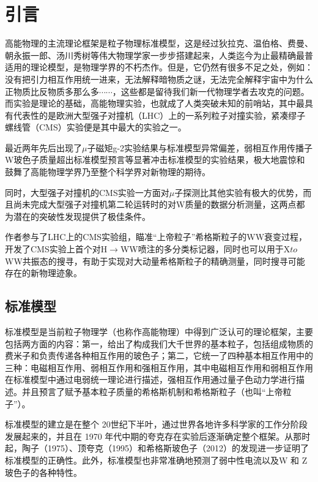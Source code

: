 \chapter{引言}
\label{chap1}
\fontsize{12bp}{14.4pt}

高能物理的主流理论框架是粒子物理标准模型，这是经过狄拉克、温伯格、费曼、朝永振一郎、汤川秀树等伟大物理学家一步步搭建起来，人类迄今为止最精确最普适用的理论模型，是物理学界的不朽杰作。但是，它仍然有很多不足之处，例如：没有把引力相互作用统一进来，无法解释暗物质之谜，无法完全解释宇宙中为什么正物质比反物质多那么多$\cdots\cdots$，这些都是留待我们新一代物理学者去攻克的问题。而实验是理论的基础，高能物理实验，也就成了人类突破未知的前哨站，其中最具有代表性的是欧洲大型强子对撞机（LHC）上的一系列粒子对撞实验，紧凑缪子螺线管（CMS）实验便是其中最大的实验之一。

最近两年先后出现了$\mu$子磁矩g-2实验结果与标准模型异常偏差\cite{muong-2}，弱相互作用传播子W玻色子质量超出标准模型预言\cite{Wmass}等显著冲击标准模型的实验结果，极大地震惊和鼓舞了高能物理学界乃至整个科学界对新物理的期待。

同时，大型强子对撞机的CMS实验一方面对$\mu$子探测比其他实验有极大的优势，而且尚未完成大型强子对撞机第二轮运转时的对W质量的数据分析测量，这两点都为潜在的突破性发现提供了极佳条件。

作者参与了LHC上的CMS实验组，瞄准“上帝粒子”希格斯粒子的WW衰变过程，开发了CMS实验上首个对H$\to$WW喷注的多分类标记器，同时也可以用于X$to$WW共振态的搜寻，有助于实现对大动量希格斯粒子的精确测量，同时搜寻可能存在的新物理迹象。

\section{标准模型}
标准模型是当前粒子物理学（也称作高能物理）中得到广泛认可的理论框架，主要包括两方面的内容：第一，给出了构成我们大千世界的基本粒子，包括组成物质的费米子和负责传递各种相互作用的玻色子；第二，它统一了四种基本相互作用中的三种：电磁相互作用、弱相互作用和强相互作用，其中电磁相互作用和弱相互作用在标准模型中通过电弱统一理论进行描述，强相互作用通过量子色动力学进行描述。并且预言了赋予基本粒子质量的希格斯机制和希格斯粒子（也叫“上帝粒子”）。

标准模型的建立是在整个 20世纪下半叶，通过世界各地许多科学家的工作分阶段发展起来的，并且在 1970 年代中期的夸克存在实验后逐渐确定整个框架。从那时起，陶子\cite{Discovery_of_Tauon}（1975）、顶夸克\cite{top_quark_discovery}（1995）和希格斯玻色子\cite{Higgs_discovery}（2012）的发现进一步证明了标准模型的正确性。此外，标准模型也非常准确地预测了弱中性电流以及W 和 Z 玻色子的各种特性。
